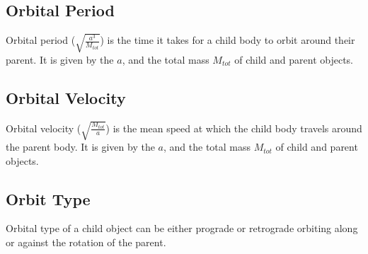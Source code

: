 \documentclass[letterpaper,10pt,english]{sphinxmanual}
\begin{document}
\subsection{Orbital Period}
\label{\detokenize{quantities/orbital/orbital_period:orbital-period}}\label{\detokenize{quantities/orbital/orbital_period::doc}}\label{\detokenize{quantities/orbital/orbital_period:id1}}
\sphinxAtStartPar
Orbital period (\(\sqrt{\frac{a^3}{M_{tot}}}\)) is the time it takes for a child body to orbit around their parent.
It is given by the {\hyperref[\detokenize{quantities/orbital/semi_major_axis:id1}]{}} \(a\), and the total mass \(M_{tot}\) of child
and parent objects.


\subsection{Orbital Velocity}
\label{\detokenize{quantities/orbital/orbital_velocity:orbital-velocity}}\label{\detokenize{quantities/orbital/orbital_velocity::doc}}\label{\detokenize{quantities/orbital/orbital_velocity:id1}}
\sphinxAtStartPar
Orbital velocity (\(\sqrt{\frac{M_{tot}}{a}}\)) is the mean speed at which the child body
travels around the parent body. It is given by the {\hyperref[\detokenize{quantities/orbital/semi_major_axis:id1}]{}} \(a\), and the
total mass \(M_{tot}\) of child and parent objects.


\subsection{Orbit Type}
\label{\detokenize{quantities/orbital/orbit_type:orbit-type}}\label{\detokenize{quantities/orbital/orbit_type::doc}}\label{\detokenize{quantities/orbital/orbit_type:id1}}
\sphinxAtStartPar
Orbital type of a child object can be either prograde or retrograde \sphinxhyphen{} orbiting
along or against the rotation of the parent.
\end{document}
